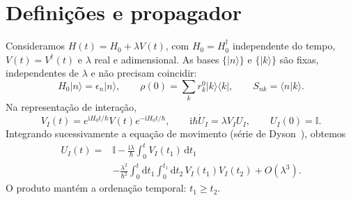 \newcommand{\ket}[1]{\lvert #1\rangle}
\newcommand{\bra}[1]{\langle #1\rvert}
\newcommand{\Tr}{\operatorname{Tr}}
\newcommand{\I}{\mathbb I}
\newcommand{\dd}{\mathrm d}
\newcommand{\ii}{\mathrm i}
\section{Definições e propagador}
Consideramos $H(t)=H_0+\lambda V(t)$, com $H_0=H_0^\dagger$ independente do tempo,
$V(t)=V^\dagger(t)$ e $\lambda$ real e adimensional. As bases
$\{\ket n\}$ e $\{\ket k\}$ são fixas, independentes de $\lambda$ e
não precisam coincidir:
\begin{equation}
 H_0\ket n=\epsilon_n\ket n,\qquad
 \rho(0)=\sum_k r_k^0\ket k\bra k,\qquad S_{nk}=\langle n|k\rangle.
 \label{eq:bases}
\end{equation}
Na representação de interação,
\begin{equation}
 V_I(t)=e^{\ii H_0t/\hbar}V(t)e^{-\ii H_0t/\hbar},\qquad
 \ii\hbar\dot U_I=\lambda V_IU_I,\qquad U_I(0)=\I.
 \label{eq:evolution}
\end{equation}
Integrando sucessivamente a equação de movimento
(série de Dyson~\cite{Reis2025Quantum}), obtemos
\begin{align}
 U_I(t)={}&\I-\frac{\ii\lambda}{\hbar}\int_0^t V_I(t_1)\,\dd t_1
 \nonumber\\
 &-\frac{\lambda^2}{\hbar^2}
 \int_0^t\dd t_1\int_0^{t_1}\dd t_2\,
 V_I(t_1)V_I(t_2)+O(\lambda^3).
 \label{eq:Dyson}
\end{align}
O produto mantém a ordenação temporal: $t_1\geq t_2$.

